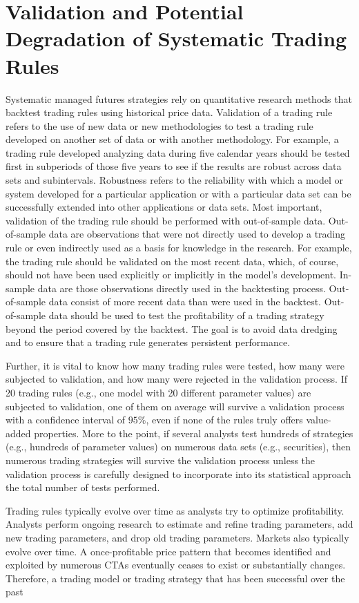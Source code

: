 \documentclass[11pt]{article}
\begin{document}
\section*{Validation and Potential Degradation of Systematic Trading Rules}
Systematic managed futures strategies rely on quantitative research methods that backtest trading rules using historical price data. Validation of a trading rule refers to the use of new data or new methodologies to test a trading rule developed on another set of data or with another methodology. For example, a trading rule developed analyzing data during five calendar years should be tested first in subperiods of those five years to see if the results are robust across data sets and subintervals. Robustness refers to the reliability with which a model or system developed for a particular application or with a particular data set can be successfully extended into other applications or data sets. Most important, validation of the trading rule should be performed with out-of-sample data. Out-of-sample data are observations that were not directly used to develop a trading rule or even indirectly used as a basis for knowledge in the research. For example, the trading rule should be validated on the most recent data, which, of course, should not have been used explicitly or implicitly in the model's development. In-sample data are those observations directly used in the backtesting process. Out-of-sample data consist of more recent data than were used in the backtest. Out-of-sample data should be used to test the profitability of a trading strategy beyond the period covered by the backtest. The goal is to avoid data dredging and to ensure that a trading rule generates persistent performance.

Further, it is vital to know how many trading rules were tested, how many were subjected to validation, and how many were rejected in the validation process. If 20 trading rules (e.g., one model with 20 different parameter values) are subjected to validation, one of them on average will survive a validation process with a confidence interval of $95 \%$, even if none of the rules truly offers value-added properties. More to the point, if several analysts test hundreds of strategies (e.g., hundreds of parameter values) on numerous data sets (e.g., securities), then numerous trading strategies will survive the validation process unless the validation process is carefully designed to incorporate into its statistical approach the total number of tests performed.

Trading rules typically evolve over time as analysts try to optimize profitability. Analysts perform ongoing research to estimate and refine trading parameters, add new trading parameters, and drop old trading parameters. Markets also typically evolve over time. A once-profitable price pattern that becomes identified and exploited by numerous CTAs eventually ceases to exist or substantially changes. Therefore, a trading model or trading strategy that has been successful over the past
\end{document}
